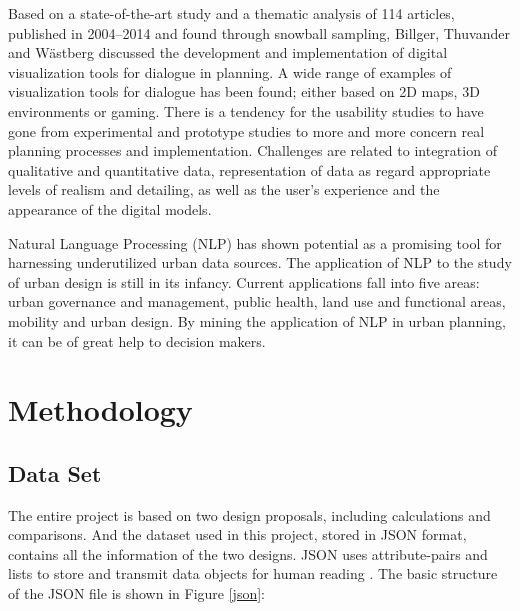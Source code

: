 Based on a state-of-the-art study and a thematic analysis of 114 articles, published in 2004–2014 and found through snowball sampling, Billger, Thuvander and Wästberg\cite{bib8} discussed the development and implementation of digital visualization tools for dialogue in planning. A wide range of examples of visualization tools for dialogue has been found; either based on 2D maps, 3D environments or gaming. There is a tendency for the usability studies to have gone from experimental and prototype studies to more and more concern real planning processes and implementation. Challenges are related to integration of qualitative and quantitative data, representation of data as regard appropriate levels of realism and detailing, as well as the user’s experience and the appearance of the digital models.

 Natural Language Processing (NLP) has shown potential as a promising tool for harnessing underutilized urban data sources\cite{bib9}. The application of NLP to the study of urban design is still in its infancy. Current applications fall into five areas: urban governance and management, public health, land use and functional areas, mobility and urban design. By mining the application of NLP in urban planning, it can be of great help to decision makers.


\section* {Methodology}
\subsection* {Data Set}
The entire project is based on two design proposals, including calculations and comparisons. And the dataset used in this project, stored in JSON format, contains all the information of the two designs. JSON uses attribute-pairs and lists to store and transmit data objects for human reading \cite{ecma2013ecma}. The basic structure of the JSON file is shown in Figure \ref{json}:

